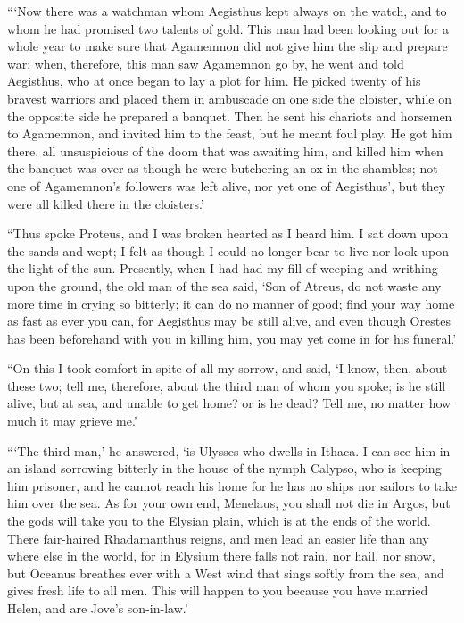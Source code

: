 “‘Now there was a watchman whom Aegisthus kept always on the watch, and to whom
he had promised two talents of gold. This man had been looking out for a whole
year to make sure that Agamemnon did not give him the slip and prepare war;
when, therefore, this man saw Agamemnon go by, he went and told Aegisthus, who
at once began to lay a plot for him. He picked twenty of his bravest warriors
and placed them in ambuscade on one side the cloister, while on the opposite
side he prepared a banquet. Then he sent his chariots and horsemen to
Agamemnon, and invited him to the feast, but he meant foul play. He got him
there, all unsuspicious of the doom that was awaiting him, and killed him when
the banquet was over as though he were butchering an ox in the shambles; not
one of Agamemnon’s followers was left alive, nor yet one of Aegisthus’, but
they were all killed there in the cloisters.’

“Thus spoke Proteus, and I was broken hearted as I heard him. I sat down upon
the sands and wept; I felt as though I could no longer bear to live nor look
upon the light of the sun. Presently, when I had had my fill of weeping and
writhing upon the ground, the old man of the sea said, ‘Son of Atreus, do not
waste any more time in crying so bitterly; it can do no manner of good; find
your way home as fast as ever you can, for Aegisthus may be still alive, and
even though Orestes has been beforehand with you in killing him, you may yet
come in for his funeral.’

“On this I took comfort in spite of all my sorrow, and said, ‘I know, then,
about these two; tell me, therefore, about the third man of whom you spoke; is
he still alive, but at sea, and unable to get home? or is he dead? Tell me, no
matter how much it may grieve me.’

“‘The third man,’ he answered, ‘is Ulysses who dwells in Ithaca. I can see him
in an island sorrowing bitterly in the house of the nymph Calypso, who is
keeping him prisoner, and he cannot reach his home for he has no ships nor
sailors to take him over the sea. As for your own end, Menelaus, you shall not
die in Argos, but the gods will take you to the Elysian plain, which is at the
ends of the world. There fair-haired Rhadamanthus reigns, and men lead an
easier life than any where else in the world, for in Elysium there falls not
rain, nor hail, nor snow, but Oceanus breathes ever with a West wind that sings
softly from the sea, and gives fresh life to all men. This will happen to you
because you have married Helen, and are Jove’s son-in-law.’

